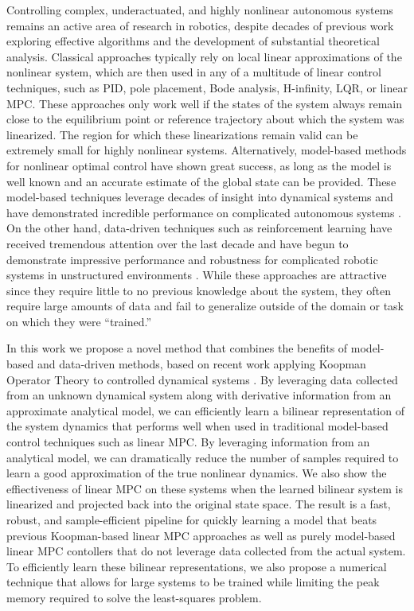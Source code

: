 \documentclass{article}
\begin{document}
Controlling complex, underactuated, and highly nonlinear autonomous systems remains an
active area of research in robotics, despite decades of previous work exploring
effective algorithms and the development of substantial theoretical analysis. Classical
approaches typically rely on local linear approximations of the nonlinear system, which
are then used in any of a multitude of linear control techniques, such as PID, pole
placement, Bode analysis, H-infinity, LQR, or linear MPC.  These approaches only work
well if the states of the system always remain close to the equilibrium point or
reference trajectory about which the system was linearized. The region for which these
linearizations remain valid can be extremely small for highly nonlinear systems.
Alternatively, model-based methods for nonlinear optimal control have shown great
success, as long as the model is well known and an accurate estimate of the global state
can be provided. These model-based techniques leverage decades of insight into
dynamical systems and have demonstrated incredible performance on complicated
autonomous systems 
\cite{farshidian_efficient_2017,Kuindersma2014,Bjelonic2021,Subosits2019} .  On the
other hand, data-driven techniques such as reinforcement learning have received
tremendous attention over the last decade and have begun to demonstrate impressive
performance and robustness for complicated robotic systems in unstructured environments
\cite{Karnchanachari2020,Hoeller2020,Li2021}. While these approaches are attractive
since they require little to no previous knowledge about the system, they often require
large amounts of data and fail to generalize outside of the domain or task on which they
were ``trained.''

In this work we propose a novel method that combines the benefits of model-based and
data-driven methods, based on recent work  applying Koopman Operator Theory to
controlled dynamical systems 
\cite{Meduri2022,Bruder2021,Korda2018,Folkestad2020,Suh2020}.
By leveraging data collected from an
unknown dynamical system along with derivative information from an approximate
analytical model, we can efficiently learn a bilinear representation of the system
dynamics that performs well when used in traditional model-based control techniques such
as linear MPC. By leveraging information from an analytical model, we can dramatically
reduce the number of samples required to learn a good approximation of the true
nonlinear dynamics. We also show the effiectiveness of linear MPC on these systems 
when the learned bilinear system is linearized and projected back into the original 
state space. The result is a fast, robust, and sample-efficient pipeline for quickly 
learning a model that beats previous Koopman-based linear MPC approaches as well as 
purely model-based linear MPC contollers that do not leverage data collected from the 
actual system. To efficiently learn these bilinear representations, we also propose 
a numerical technique that allows for large systems to be trained while limiting the 
peak memory required to solve the least-squares problem.
\end{document}

